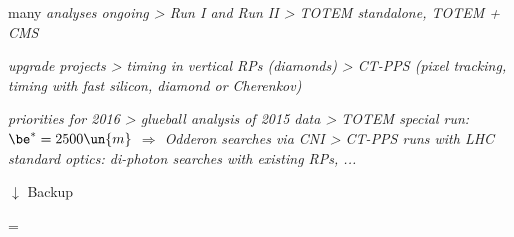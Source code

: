 \vfil

\> many \em{analyses} ongoing
\>> Run I and Run II
\>> TOTEM standalone, TOTEM + CMS

\vfil

\> \em{upgrade} projects
\>> timing in vertical RPs (diamonds)
\>> CT-PPS (pixel tracking, timing with fast silicon, diamond or Cherenkov)

\vfil

\> \em{priorities} for 2016
\>> glueball analysis of 2015 data
\>> TOTEM special run: $\be^* = 2500\un{m}$ $\Rightarrow$ Odderon searches via CNI
\>> CT-PPS runs with LHC standard optics: di-photon searches with existing RPs, ...



\newpage %
\hbox{}%
\vfill
\centerline{ $\downarrow$ Backup}
\footline={}


\iffalse
\newpage %
\title{Backup topics}

\> Optics refinement with RP data

\> Coulomb analysis
\>> interference formulae
\>> phase choices

\fi

\newpage %
\centerline{}

\newpage %
\centerline{}

\newpage %
\centerline{}

\newpage %
\centerline{}

\vfil
\eject
\bye
